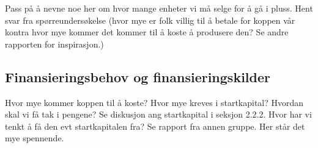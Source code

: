 Pass på å nevne noe her om hvor mange enheter vi må selge for å gå i pluss. 
Hent svar fra spørreundersøkelse (hvor mye er folk villig til å betale for koppen vår kontra hvor mye kommer det kommer til å koste å produsere den? Se andre rapporten for inspirasjon.)

\subsection{Finansieringsbehov og finansieringskilder}
Hvor mye kommer koppen til å koste? Hvor mye kreves i startkapital? Hvordan skal vi få tak i pengene? Se diskusjon ang startkapital i seksjon 2.2.2.
Hvor har vi tenkt å få den evt startkapitalen fra? Se rapport fra annen gruppe. Her står det mye spennende.
